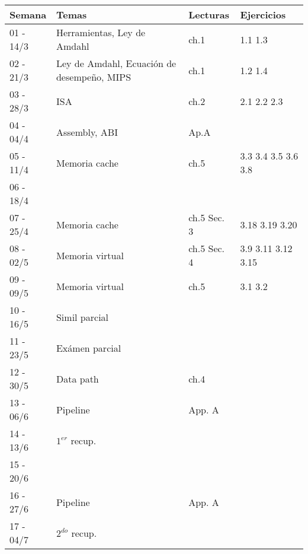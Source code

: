 \documentclass[9pt,a4paper]{article}
\begin{document}
\begin{tabular}{ |l | l | l | l |}
\hline
Semana & Temas			& Lecturas     & Ejercicios						\\
\hline
01 - 14/3	& Herramientas, Ley de Amdahl 		& ch.1 \cite{caaqa}	&	1.1 1.3		\\
\hline
02 - 21/3	& Ley de Amdahl, Ecuación de desempeño, MIPS & ch.1 \cite{caaqa}    & 1.2 1.4	\\
\hline
03 - 28/3	& ISA					&		ch.2 \cite{caaqa}	&	2.1 2.2 2.3				\\
\hline
04 - 04/4	& Assembly, ABI 	& 		Ap.A \cite{caaqa} \cite{abi} &	\\
\hline
05 - 11/4	& Memoria cache	& 	ch.5 \cite{caaqa}	&	3.3 3.4 3.5 3.6 3.8
\\
\hline
\rowcolor{lightgray} 06 - 18/4	& 	& 		&		\\
\hline
07 - 25/4	& Memoria cache	& 		ch.5 \cite{caaqa} Sec. 3 \cite{wepskam}&	 3.18 3.19 3.20
\\
\hline
08 - 02/5	& Memoria virtual	&	ch.5 \cite{caaqa} Sec. 4 \cite{wepskam}&	 3.9 3.11 3.12 3.15\\
\hline
09 - 09/5	& Memoria virtual	& 	ch.5 \cite{caaqa} \cite{vmp1} \cite{vmp2} &	3.1 3.2 \\
\hline
10 - 16/5	& Simil parcial	&		&							\\
\hline
\rowcolor{green} 11 - 23/5	& Exámen parcial	& 	&								\\
\hline
12 - 30/5	& Data path			& 	ch.4 \cite{coadhsi} & \\
\hline
13 - 06/6 & Pipeline			& App. A \cite{caaqa}	&	\\
\hline
\rowcolor{green} 14 - 13/6 & $1^{er}$ recup.	&		&							\\
\hline
\rowcolor{lightgray} 15 - 20/6	& 			&	&								\\
\hline
16 - 27/6 & Pipeline 	&	App. A \cite{caaqa}			& \\
\hline
\rowcolor{green} 17 - 04/7 & $2^{do}$ recup.			&		& \\
\hline

\end{tabular}

\renewcommand\refname{Lecturas}
\end{document}
